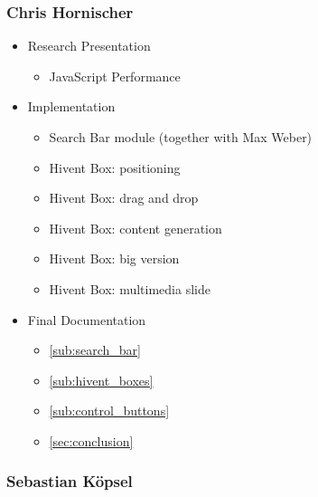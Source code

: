
\subsubsection{Chris Hornischer} %
\label{ssub:chris_hornischer}

\begin{itemize}
  \item Research Presentation
  \begin{itemize}
    \item JavaScript Performance
  \end{itemize}
  \item Implementation
  \begin{itemize}
    \item Search Bar module (together with Max Weber)
    \item Hivent Box: positioning
    \item Hivent Box: drag and drop
    \item Hivent Box: content generation
    \item Hivent Box: big version
    \item Hivent Box: multimedia slide
  \end{itemize}
  \item Final Documentation
  \begin{itemize}
    \item \ref{sub:search_bar} 
    \item \ref{sub:hivent_boxes} 
    \item \ref{sub:control_buttons} 
    \item \ref{sec:conclusion} 
  \end{itemize}
\end{itemize}


\subsubsection{Sebastian Köpsel} %
\label{ssub:sebastian_koepsel}

